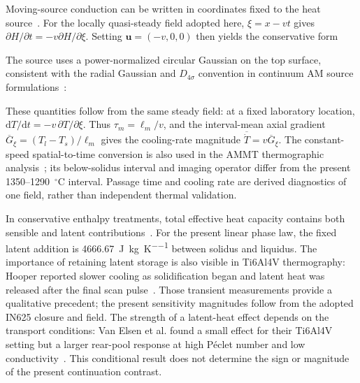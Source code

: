 Moving-source conduction can be written in coordinates fixed to the heat source~\cite{vanelsen2007}. For the locally quasi-steady field adopted here, $\xi=x-vt$ gives $\partial H/\partial t=-v\partial H/\partial\xi$. Setting $\bm u=(-v,0,0)$ then yields the conservative form

The source uses a power-normalized circular Gaussian on the top surface, consistent with the radial Gaussian and $D_{4\sigma}$ convention in continuum AM source formulations~\cite{dynamic2024}:

These quantities follow from the same steady field: at a fixed laboratory location, $\mathrm dT/\mathrm dt=-v\,\partial T/\partial\xi$. Thus $\tau_m=\ell_m/v$, and the interval-mean axial gradient $\overline G_\xi=(T_l-T_s)/\ell_m$ gives the cooling-rate magnitude $\overline{\dot T}=v\overline G_\xi$. The constant-speed spatial-to-time conversion is also used in the AMMT thermographic analysis~\cite{lane2020}; its below-solidus interval and imaging operator differ from the present 1350--1290~$^\circ$C interval. Passage time and cooling rate are derived diagnostics of one field, rather than independent thermal validation.

In conservative enthalpy treatments, total effective heat capacity contains both sensible and latent contributions~\cite{vanelsen2007}. For the present linear phase law, the fixed latent addition is 4666.67~\si{\joule\per\kilogram\per\kelvin} between solidus and liquidus.
The importance of retaining latent storage is also visible in Ti6Al4V thermography: Hooper reported slower cooling as solidification began and latent heat was released after the final scan pulse~\cite{hooper2018}. Those transient measurements provide a qualitative precedent; the present sensitivity magnitudes follow from the adopted IN625 closure and field.
The strength of a latent-heat effect depends on the transport conditions: Van Elsen et al. found a small effect for their Ti6Al4V setting but a larger rear-pool response at high P\'eclet number and low conductivity~\cite{vanelsen2007}. This conditional result does not determine the sign or magnitude of the present continuation contrast.

